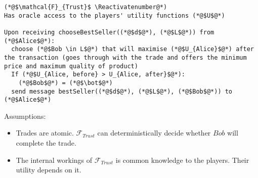 \Suppressnumber
\begin{lstlisting}[label=trustfunc, style=numbers]
(*@$\mathcal{F}_{Trust}$ \Reactivatenumber@*)
Has oracle access to the players' utility functions (*@$U$@*)

Upon receiving chooseBestSeller((*@$d$@*), (*@$L$@*)) from (*@$Alice$@*):
  choose (*@$Bob \in L$@*) that will maximise (*@$U_{Alice}$@*) after the transaction (goes through with the trade and offers the minimum price and maximum quality of product)
  If (*@$U_{Alice, before} > U_{Alice, after}$@*):
    (*@$Bob$@*) = (*@$\bot$@*)
  send message bestSeller((*@$d$@*), (*@$L$@*), (*@$Bob$@*)) to (*@$Alice$@*)
\end{lstlisting}

Assumptions:
\begin{itemize}
  \item Trades are atomic. $\mathcal{F}_{Trust}$ can deterministically decide whether
  $Bob$ will complete the trade.
  \item The internal workings of $\mathcal{F}_{Trust}$ is common knowledge to the players.
  Their utility depends on it.
\end{itemize}

